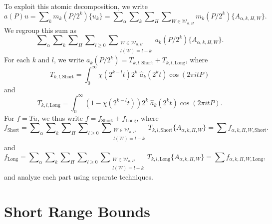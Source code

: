To exploit this atomic decomposition, we write
%
\begin{equation}
    a(P) u = \sum\nolimits_k m_k(P/2^k) \{ u_k \} = \sum\nolimits_\alpha \sum\nolimits_k \sum\nolimits_H \sum\nolimits_{W \in \mathcal{W}_{\alpha,H}} m_k(P/2^k) \{ A_{\alpha,k,H,W} \}.
\end{equation}
%
We regroup this sum as
%
\begin{equation}
    \sum\nolimits_\alpha \sum\nolimits_k \sum\nolimits_H \sum\nolimits_{l \geq 0} \sum\nolimits_{\substack{W \in \mathcal{W}_{\alpha,H}\\l(W) = l - k}} a_k(P/2^k) \{ A_{\alpha,k,H,W} \}.
\end{equation}
%
For each $k$ and $l$, we write $a_k(P/2^k) = T_{k,l,\text{Short}} + T_{k,l,\text{Long}}$, where
%
\begin{equation}
    T_{k,l,\text{Short}} = \int_0^\infty \chi( 2^{k-l} t ) 2^k\;\! \widehat{a}_k(2^k t) \cos(2 \pi i t P)
\end{equation}
%
and
%
\begin{equation}
    T_{k,l,\text{Long}} = \int_0^\infty (1 - \chi(2^{k-l} t )) 2^k\;\! \widehat{a}_k(2^k t) \cos(2 \pi i t P). 
\end{equation}
%
For $f = Tu$, we thus write $f = f_{\text{Short}} + f_{\text{Long}}$, where
%
\begin{equation}
    f_{\text{Short}} = \sum\nolimits_\alpha \sum\nolimits_k \sum\nolimits_H \sum\nolimits_{l \geq 0} \sum\nolimits_{\substack{W \in \mathcal{W}_{\alpha,H}\\l(W) = l - k}} T_{k,l,\text{Short}} \{ A_{\alpha,k,H,W} \} = \sum f_{\alpha,k,H,W,\text{Short}}. 
\end{equation}
%
and
%
\begin{equation}
    f_{\text{Long}} = \sum\nolimits_\alpha \sum\nolimits_k \sum\nolimits_H \sum\nolimits_{l \geq 0} \sum\nolimits_{\substack{W \in \mathcal{W}_{\alpha,H}\\l(W) = l - k}} T_{k,l,\text{Long}} \{ A_{\alpha,k,H,W} \} = \sum f_{\alpha,k,H,W,\text{Long}},
\end{equation}
%
and analyze each part using separate techniques.

\section{Short Range Bounds}

